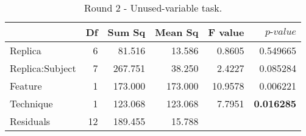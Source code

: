 \documentclass{sig-alternate}
\begin{document}
\begin{table}[h]
\begin{center}
\footnotesize
\begin{tabular}{lrrrrr}
\hline
& Df & Sum Sq & Mean Sq & F value & $p\mbox{-}value$ \\
\hline
Replica & 6 & 81.516 & 13.586 & 0.8605 & 0.549665 \\
Replica:Subject & 7 & 267.751 & 38.250 & 2.4227 & 0.085284 \\
Feature & 1 & 173.000 & 173.000 & 10.9578 & 0.006221 \\
Technique & 1 & 123.068 & 123.068 & 7.7951 & {\bf 0.016285} \\
Residuals & 12 & 189.455 & 15.788 & & \\
\hline
\end{tabular}
\normalsize
\end{center}
\caption{Round 2 - Unused-variable task.}
\label{tab:anova-r2-m2}
\end{table}
\end{document}
